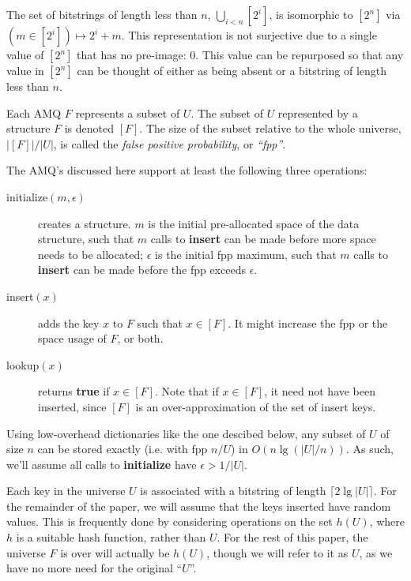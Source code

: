 \documentclass[11pt,letterpaper]{article}
\begin{document}
The set of bitstrings of length less than $n$,  $\bigcup_{i < n} [2^i]$, is isomorphic to $[2^n]$ via $(m \in [2^i]) \mapsto 2^i + m$.
This representation is not surjective due to a single value of $[2^n]$ that has no pre-image: $0$.
This value can be repurposed so that any value in $[2^n]$ can be thought of either as being absent or a bitstring of length less than $n$.

Each AMQ $F$ represents a subset of $U$.
The subset of $U$ represented by a structure $F$ is denoted $[F]$.
The size of the subset relative to the whole universe, $|[F]|/|U|$, is called the {\em false positive probability}, or {\em ``fpp''}.

The AMQ's discussed here support at least the following three operations:

\begin{description}
\item[initialize$(m, \epsilon)$] creates a structure.
  $m$ is the initial pre-allocated space of the data structure, such that $m$ calls to {\bf insert} can be made before more space needs to be allocated;
  $\epsilon$ is the initial fpp maximum, such that $m$ calls to {\bf insert} can be made before the fpp exceeds $\epsilon$.
\item[insert$(x)$] adds the key $x$ to $F$ such that $x \in [F]$.
  It might increase the fpp or the space usage of $F$, or both.
\item[lookup$(x)$] returns {\bf true} if $x \in [F]$.
  Note that if $x \in [F]$, it need not have been inserted, since $[F]$ is an over-approximation of the set of insert keys.
\end{description}

Using low-overhead dictionaries like the one descibed below, any subset of $U$ of size $n$ can be stored exactly (i.e. with fpp $n/U$) in $O(n \lg (|U|/n))$.
As such, we'll assume all calls to {\bf initialize} have $\epsilon > 1/|U|$.

Each key in the universe $U$ is associated with a bitstring of length $\lceil 2 \lg |U| \rceil$.
For the remainder of the paper, we will assume that the keys inserted have random values.
This is frequently done by considering operations on the set $h(U)$, where $h$ is a suitable hash function, rather than $U$.
For the rest of this paper, the universe $F$ is over will actually be $h(U)$, though we will refer to it as $U$, as we have no more need for the original ``$U$''.
\end{document}
